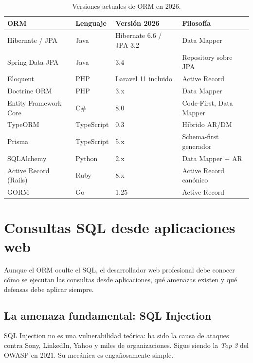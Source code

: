 \begin{table}[htbp]
\centering
\caption{Versiones actuales de ORM en 2026.}
\footnotesize
\begin{tabular}{llll}
\toprule
\textbf{ORM} & \textbf{Lenguaje} & \textbf{Versión 2026} & \textbf{Filosofía}\\
\midrule
Hibernate / JPA      & Java       & Hibernate 6.6 / JPA 3.2 & Data Mapper\\
Spring Data JPA      & Java       & 3.4                     & Repository sobre JPA\\
Eloquent             & PHP        & Laravel 11 incluido     & Active Record\\
Doctrine ORM         & PHP        & 3.x                     & Data Mapper\\
Entity Framework Core & C\#       & 8.0                     & Code-First, Data Mapper\\
TypeORM              & TypeScript & 0.3                     & Híbrido AR/DM\\
Prisma               & TypeScript & 5.x                     & Schema-first generador\\
SQLAlchemy           & Python     & 2.x                     & Data Mapper + AR\\
Active Record (Rails) & Ruby      & 8.x                     & Active Record canónico\\
GORM                 & Go         & 1.25                    & Active Record\\
\bottomrule
\end{tabular}
\end{table}

\section{Consultas SQL desde aplicaciones web}

Aunque el ORM oculte el SQL, el desarrollador web profesional
debe conocer cómo se ejecutan las consultas desde aplicaciones,
qué amenazas existen y qué defensas debe aplicar siempre.


\subsection{La amenaza fundamental: SQL Injection}

SQL Injection no es una vulnerabilidad teórica: ha sido la
causa de ataques contra Sony, LinkedIn, Yahoo y miles de
organizaciones. Sigue siendo la \emph{Top 3} del OWASP en 2021. Su
mecánica es engañosamente simple.


